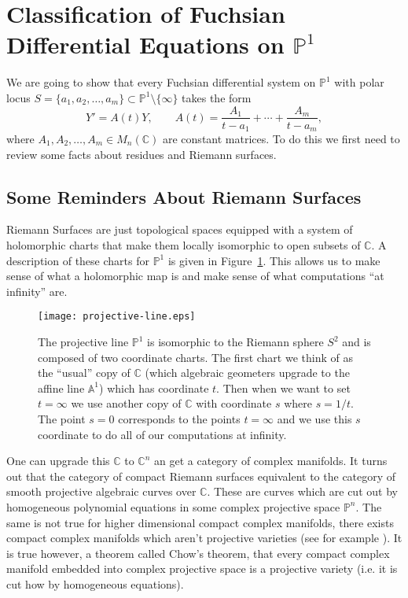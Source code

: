\documentclass[12pt]{book}
\numberwithin{equation}{section}
\theoremstyle{definition}
\theoremstyle{remark}
\newcommand{\CC}{\mathbb{C}}
\renewcommand{\AA}{\mathbb{A}}
\newcommand{\PP}{\mathbb{P}}
\begin{document}
\section[Classification of Fuchsian Equations]{Classification of Fuchsian Differential Equations on $\PP^1$}
We are going to show that every Fuchsian differential system on $\PP^1$ with polar locus $S = \lbrace a_1,a_2,\ldots, a_m\rbrace \subset \PP^1\setminus \lbrace \infty \rbrace$ takes the form  
 $$ Y' = A(t) Y, \qquad A(t) = \frac{A_1}{t-a_1} + \cdots + \frac{A_m}{t-a_m},$$
where $A_1,A_2,\ldots, A_m \in M_n(\CC)$ are constant matrices.
To do this we first need to review some facts about residues and Riemann surfaces.


\subsection{Some Reminders About Riemann Surfaces}
Riemann Surfaces are just topological spaces equipped with a system of holomorphic charts that make them locally isomorphic to open subsets of $\CC$. 
A description of these charts for $\PP^1$ is given in Figure~\ref{F:projective-line}.
This allows us to make sense of what a holomorphic map is and make sense of what computations ``at infinity'' are. 

\begin{figure}[h]\label{F:projective-line}
	\begin{center}
		\texttt{[image: projective-line.eps]}
	\end{center}
	\caption{The projective line $\PP^1$ is isomorphic to the Riemann sphere $S^2$ and is composed of two coordinate charts. 
		The first chart we think of as the ``usual'' copy of $\CC$ (which algebraic geometers upgrade to the affine line $\AA^1$) which has coordinate $t$. 
		Then when we want to set $t=\infty$ we use another copy of $\CC$ with coordinate $s$ where $s=1/t$.
		The point $s=0$ corresponds to the points $t=\infty$ and we use this $s$ coordinate to do all of our computations at infinity. }
\end{figure}

One can upgrade this $\CC$ to $\CC^n$ an get a category of complex manifolds. 
It turns out that the category of compact Riemann surfaces equivalent to the category of smooth projective algebraic curves over $\CC$.
These are curves which are cut out by homogeneous polynomial equations in some complex projective space $\PP^n$. 
The same is not true for higher dimensional compact complex manifolds, there exists compact complex manifolds which aren't projective varieties (see for example \cite[pg 161]{Shafarevich2013}). 
It is true however, a theorem called Chow's theorem, that every compact complex manifold embedded into complex projective space is a projective variety (i.e. it is cut how by homogeneous equations). 
\end{document}
